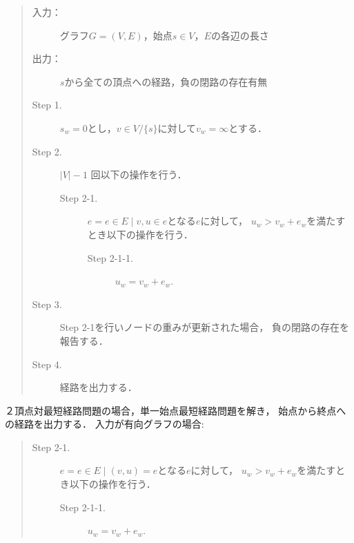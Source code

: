 \documentclass[12pt]{optlab-bachelor}
\begin{document}
\begin{itemize}
  \begin{quote}
    \begin{description}
      \item[入力：] グラフ$G=(V,E)$，始点$s \in V$，$E$の各辺の長さ
      \item[出力：] $s$から全ての頂点への経路，負の閉路の存在有無
      \item[Step 1.] $s_w = 0$とし，$v \in V/\{s\}$に対して$v_w = \infty$とする．
      \item[Step 2.] $|V|-1$ 回以下の操作を行う．
      \begin{description}
        \item[Step 2-1.] $e = {e \in E \mid v,u \in e}$となる$e$に対して，
        $u_w > v_w + e_w$を満たすとき以下の操作を行う．
        \begin{description}
          \item[Step 2-1-1.] $u_w = v_w + e_w$.
        \end{description}
      \end{description}
      \item[Step 3.] Step 2-1を行いノードの重みが更新された場合，
      負の閉路の存在を報告する．
      \item[Step 4.] 経路を出力する．
    \end{description}
  \end{quote}
  ２頂点対最短経路問題の場合，単一始点最短経路問題を解き，
  始点から終点への経路を出力する．
  入力が有向グラフの場合:
  \begin{quote}
    \begin{description}
      \item[Step 2-1.] $e = {e \in E \mid (v,u) = e}$となる$e$に対して，
      $u_w > v_w + e_w$を満たすとき以下の操作を行う．
      \begin{description}
        \item[Step 2-1-1.] $u_w = v_w + e_w$.
      \end{description}
    \end{description}
  \end{quote}
\end{itemize}
\end{document}
